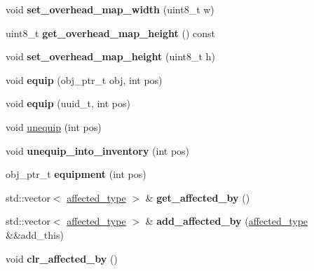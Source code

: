 \begin{DoxyCompactItemize}
void {\bfseries set\+\_\+overhead\+\_\+map\+\_\+width} (uint8\+\_\+t w)
\item 
\mbox{\label{classmods_1_1player_a34400d516c566141a85314a5f1965c16}} 
uint8\+\_\+t {\bfseries get\+\_\+overhead\+\_\+map\+\_\+height} () const
\item 
\mbox{\label{classmods_1_1player_afc76c62b352e1712285f9d4a413842fb}} 
void {\bfseries set\+\_\+overhead\+\_\+map\+\_\+height} (uint8\+\_\+t h)
\item 
\mbox{\label{classmods_1_1player_a7100859429762d41f258d69abf957448}} 
void {\bfseries equip} (obj\+\_\+ptr\+\_\+t obj, int pos)
\item 
\mbox{\label{classmods_1_1player_affcfe3327d9526ba8a9b1b9ce100132c}} 
void {\bfseries equip} (uuid\+\_\+t, int pos)
\item 
void \hyperlink{classmods_1_1player_a7fd5d35771a57dfe6c8ec7e1199873ab}{unequip} (int pos)
\item 
\mbox{\label{classmods_1_1player_a77034697db672561d57031c50b35ed9a}} 
void {\bfseries unequip\+\_\+into\+\_\+inventory} (int pos)
\item 
\mbox{\label{classmods_1_1player_add46b348bad812bdc34aeb8d79249ee4}} 
obj\+\_\+ptr\+\_\+t {\bfseries equipment} (int pos)
\item 
\mbox{\label{classmods_1_1player_ab8fe6141a54bcfdb0faa04daee8fb972}} 
std\+::vector$<$ \hyperlink{structaffected__type}{affected\+\_\+type} $>$ \& {\bfseries get\+\_\+affected\+\_\+by} ()
\item 
\mbox{\label{classmods_1_1player_a3f4ba46ea9cc91d8434793efd41a7d90}} 
std\+::vector$<$ \hyperlink{structaffected__type}{affected\+\_\+type} $>$ \& {\bfseries add\+\_\+affected\+\_\+by} (\hyperlink{structaffected__type}{affected\+\_\+type} \&\&add\+\_\+this)
\item 
\mbox{\label{classmods_1_1player_ab1df40b3ba4fd35a3eee15d6ad900d6b}} 
void {\bfseries clr\+\_\+affected\+\_\+by} ()
\item 

\end{DoxyCompactItemize}
